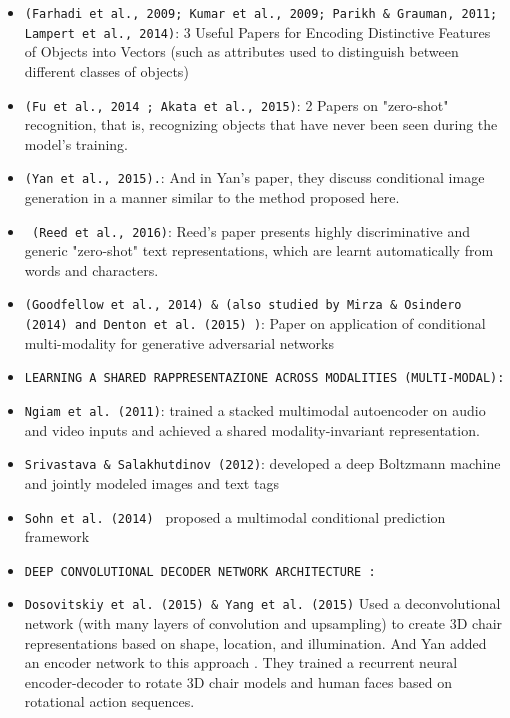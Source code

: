  \begin{itemize}[noitemsep]
    \item \texttt{(Farhadi et al., 2009; Kumar et al., 2009;
    Parikh \& Grauman, 2011; Lampert et al., 2014)}: 
    3 Useful Papers for Encoding Distinctive Features of Objects 
    into Vectors (such as attributes used to distinguish 
    between different classes of objects)
    \item \texttt{(Fu et al., 2014 ; Akata et al., 2015)}: 
    2 Papers on "zero-shot" recognition, that is, recognizing 
    objects that have never been seen during the model's training.
    \item \texttt{(Yan et al., 2015).}: 
    And in Yan's paper, they discuss conditional image generation 
    in a manner similar to the method proposed here.
    \item \texttt{ (Reed et al., 2016)}: 
    Reed's paper presents highly discriminative and generic
    "zero-shot" text representations, 
    which are learnt automatically from words and characters.
    \item \texttt{(Goodfellow et al., 2014) \& (also studied
    by Mirza \& Osindero (2014) and Denton et al. (2015) )}: 
    Paper on application of conditional multi-modality for generative adversarial networks 

    \item \texttt{LEARNING A SHARED RAPPRESENTAZIONE ACROSS MODALITIES (MULTI-MODAL):}

    \item \texttt{Ngiam et al. (2011)}: 
    trained a stacked multimodal autoencoder on audio and video inputs and achieved a shared 
    modality-invariant representation.

    \item \texttt{Srivastava \& Salakhutdinov (2012)}: 
    developed a deep Boltzmann machine and jointly modeled images and text tags

    \item \texttt{Sohn et al. (2014) }
    proposed a multimodal conditional prediction framework

    \item \texttt{DEEP CONVOLUTIONAL DECODER NETWORK ARCHITECTURE :}
    
    \item \texttt{Dosovitskiy et al. (2015) \& Yang et al. (2015)}
    Used a deconvolutional network (with many layers of convolution and upsampling) 
    to create 3D chair representations based on shape, location, and illumination.
    And Yan added an encoder network to this approach .
    They trained a recurrent neural encoder-decoder to rotate 3D chair models
    and human faces based on rotational action sequences.


\end{itemize}
